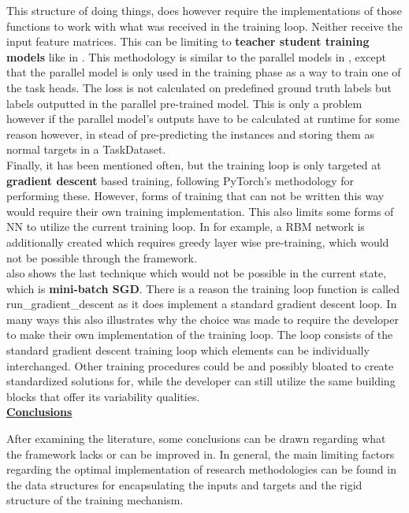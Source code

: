 This structure of doing things, does however require the implementations of those functions to work with what was received in the training loop. Neither receive the input feature matrices. This can be limiting to \textbf{teacher student training models} like in \cite{imoto2020sound}. This methodology is similar to the parallel models in \cite{wu2020domain}, except that the parallel model is only used in the training phase as a way to train one of the task heads. The loss is not calculated on predefined ground truth labels but labels outputted in the parallel pre-trained model. This is only a problem however if the parallel model's outputs have to be calculated at runtime for some reason however, in stead of pre-predicting the instances and storing them as normal targets in a TaskDataset. \\

Finally, it has been mentioned often, but the training loop is only targeted at \textbf{gradient descent} based training, following PyTorch's methodology for performing these. However, forms of training that can not be written this way would require their own training implementation. This also limits some forms of NN to utilize the current training loop. In \cite{georgiev2017heterogeneous} for example, a RBM network is additionally created which requires greedy layer wise pre-training, which would not be possible through the framework.\\

\cite{georgiev2017heterogeneous} also shows the last technique which would not be possible in the current state, which is \textbf{mini-batch SGD}. There is a reason the training loop function is called run\_gradient\_descent as it does implement a standard gradient descent loop. In many ways this also illustrates why the choice was made to require the developer to make their own implementation of the training loop. The loop consists of the standard gradient descent training loop which elements can be individually interchanged. Other training procedures could be and possibly bloated to create standardized solutions for, while the developer can still utilize the same building blocks that offer its variability qualities.\\

\underline{\textbf{Conclusions}}

After examining the literature, some conclusions can be drawn regarding what the framework lacks or can be improved in. In general, the main limiting factors regarding the optimal implementation of research methodologies can be found in the data structures for encapsulating the inputs and targets and the rigid structure of the training mechanism. \\

